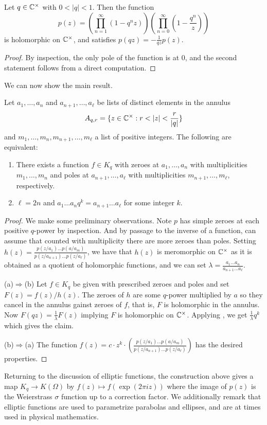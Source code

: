 \begin{lemma}\label{lem: producing q-scaling invariant functions}
    Let $q\in\mathbb{C}^{\times}$ with $0<|q|<1$. Then the function 
    $$p(z)=\left(\prod_{n=1}^{\infty}(1-q^{n}z)\right)\left(\prod_{n=0}^{\infty}\left(1-\frac{q^{n}}{z}\right)\right)$$
    is holomorphic on $\mathbb{C}^{\times}$, and satisfies $p(qz)=-\frac{1}{qz}p(z)$. 
\end{lemma}
\begin{proof}
    By inspection, the only pole of the function is at 0, and the second statement follows from a direct computation. 
\end{proof}
We can now show the main result. 
\begin{theorem}\label{thm: function on annulus with prescribed zeroes and poles}
    Let $a_{1},\dots,a_{n}$ and $a_{n+1},\dots,a_{\ell}$ be lists of distinct elements in the annulus
    $$A_{q,r}=\{z\in\CC^{\times}:r<|z|<\frac{r}{|q|}\}$$
    and $m_{1},\dots,m_{n},m_{n+1},\dots,m_{\ell}$ a list of positive integers. The following are equivalent:
    \begin{enumerate}[label=(\alph*)]
        \item There exists a function $f\in K_{q}$ with zeroes at $a_{1},\dots,a_{n}$ with multiplicities $m_{1},\dots,m_{n}$ and poles at $a_{n+1},\dots,a_{\ell}$ with multiplicities $m_{n+1},\dots,m_{\ell}$, respectively. 
        \item $\ell=2n$ and $a_{1}\dots a_{n}q^{k}=a_{n+1}\dots a_{\ell}$ for some integer $k$. 
    \end{enumerate}
\end{theorem}
\begin{proof}
    We make some preliminary observations. Note $p$ has simple zeroes at each positive $q$-power by inspection. And by passage to the inverse of a function, can assume that counted with multiplicity there are more zeroes than poles. Setting $h(z)=\frac{p(z/a_{1})\dots p(a/a_{m})}{p(z/a_{n+1})\dots p(z/a_{\ell})}$, we have that $h(z)$ is meromorphic on $\mathbb{C}^{\times}$ as it is obtained as a quotient of holomorphic functions, and we can set $\lambda=\frac{a_{1}\dots a_{n}}{a_{n+1}\dots a_{\ell}}$. 

    (a)$\Rightarrow$(b) Let $f\in K_{q}$ be given with prescribed zeroes and poles and set $F(z)=f(z)/h(z)$. The zeroes of $h$ are some $q$-power multiplied by $a$ so they cancel in the annulus gainst zeroes of $f$, that is, $F$ is holomorphic in the annulus. Now $F(qz)=\frac{1}{\lambda}F(z)$ implying $F$ is holomorphic on $\mathbb{C}^{\times}$. Applying , we get $\frac{1}{\lambda}q^{k}$ which gives the claim. 
    
    (b)$\Rightarrow$(a) The function $f(z)=c\cdot z^{k}\cdot\left(\frac{p(z/a_{1})\dots p(a/a_{m})}{p(z/a_{n+1})\dots p(z/a_{\ell})}\right)$ has the desired properties. 
\end{proof}
Returning to the discussion of elliptic functions, the construction above gives a map $K_{q}\to K(\Omega)$ by $f(z)\mapsto f(\exp(2\pi i z))$ where the image of $p(z)$ is the Weierstrass $\sigma$ function up to a correction factor. We additionally remark that elliptic functions are used to parametrize parabolas and ellipses, and are at times used in physical mathematics. 